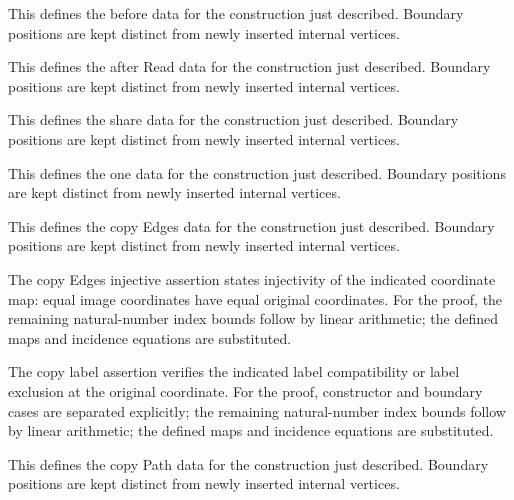 This defines the before data for the construction just described. Boundary positions are kept distinct from newly inserted internal vertices.
\par{}

This defines the after Read data for the construction just described. Boundary positions are kept distinct from newly inserted internal vertices.
\par{}

This defines the share data for the construction just described. Boundary positions are kept distinct from newly inserted internal vertices.
\par{}

This defines the one data for the construction just described. Boundary positions are kept distinct from newly inserted internal vertices.
\par{}

This defines the copy Edges data for the construction just described. Boundary positions are kept distinct from newly inserted internal vertices.
\par{}

The copy Edges injective assertion states injectivity of the indicated coordinate map: equal image coordinates have equal original coordinates.
For the proof, the remaining natural-number index bounds follow by linear arithmetic; the defined maps and incidence equations are substituted.
\par{}

The copy label assertion verifies the indicated label compatibility or label exclusion at the original coordinate.
For the proof, constructor and boundary cases are separated explicitly; the remaining natural-number index bounds follow by linear arithmetic; the defined maps and incidence equations are substituted.
\par{}

This defines the copy Path data for the construction just described. Boundary positions are kept distinct from newly inserted internal vertices.
\par{}


